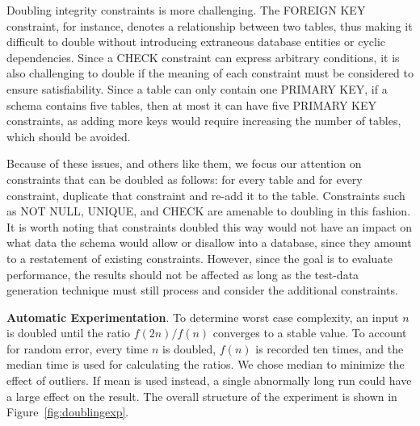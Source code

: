 

  Doubling integrity constraints is more challenging.  The FOREIGN KEY constraint, for instance, denotes a relationship
  between two tables, thus making it difficult to double without introducing extraneous database entities or cyclic
  dependencies.  Since a CHECK constraint can express arbitrary conditions, it is also challenging to double if the
  meaning of each constraint must be considered to ensure
  satisfiability.  Since a table can only contain one PRIMARY KEY, if a
  schema contains five tables, then at most it can have five PRIMARY KEY
  constraints, as adding more keys would require
  increasing the number of tables, which should be avoided.




  Because of these issues, and others like them, we focus our attention on constraints that can be doubled as follows:
  for every table and for every constraint, duplicate that constraint and re-add it to the table.  Constraints such as
  NOT NULL, UNIQUE, and CHECK are amenable to doubling in this fashion.  It is worth noting that constraints doubled this way
  would not have an impact on what data the schema would allow or disallow into a database, since they amount to a
  restatement of existing constraints.  However, since the goal is to evaluate performance, the results should not be
  affected as long as the test-data generation technique must still process and consider the additional constraints.

  \textbf{Automatic Experimentation}. To determine worst case complexity, an input $n$ is doubled until the ratio $f(2n)
  / f(n)$ converges to a stable value.  To account for random error, every time $n$ is doubled, $f(n)$ is recorded ten
  times, and the median time is used for calculating the ratios.  We chose median to minimize the effect of outliers. If
  mean is used instead, a single abnormally long run could have a large effect on the result. The overall structure of
  the experiment is shown in Figure~\ref{fig:doublingexp}.

